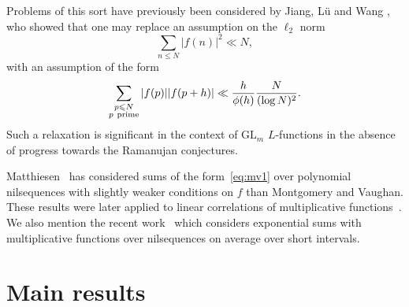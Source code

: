 \documentclass[12pt]{amsart}
\def\\{\cr}
\def\le{\leqslant}
\begin{document}
 Problems of this sort have previously been considered by  Jiang, L\"{u} and Wang \cite{Y}, who showed that one may replace an assumption on the $\ell_2$ norm
$$\sum_{n\le N}|f(n)|^2\ll N,$$
with an assumption of the form 
$$\sum_{\substack{p\le N \\ p \ \text{prime}}}|f(p)||f(p+h)|\ll \frac{h}{\phi(h)}\frac{N}{(\log{N})^2}.$$
Such a relaxation is significant in the context of $\text{GL}_m$ $L$-functions in the absence of progress towards the Ramanujan conjectures.

Matthiesen~\cite{Math} has considered sums of the form~\eqref{eq:mv1} over polynomial nilsequences with slightly weaker conditions on $f$ than Montgomery and Vaughan. These results were later applied to linear correlations of multiplicative functions~\cite{Math1}. We also mention the recent work~\cite{MMMM} which considers exponential sums with multiplicative functions over nilsequences on average over short intervals.







\section{Main results}
\end{document}
